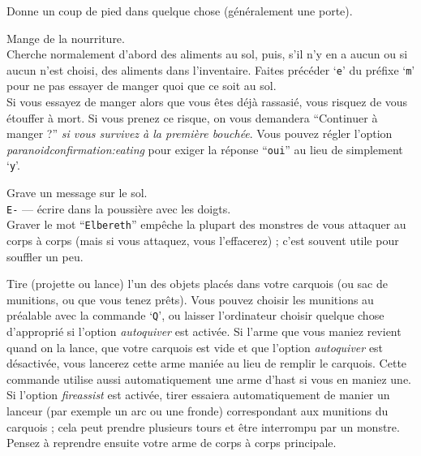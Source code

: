 \documentclass[titlepage]{article}
\begin{document}
\begin{description}[font=\mdseries\ttfamily]
\item[\textasciicircum D]
Donne un coup de pied dans quelque chose (généralement une porte).
\item[e]
Mange de la nourriture.\\
Cherche normalement d'abord des aliments au sol, puis, s'il n'y en a aucun
ou si aucun n'est choisi, des aliments dans l'inventaire.
Faites précéder `\texttt{e}' du préfixe `\texttt{m}' pour ne pas essayer de manger
quoi que ce soit au sol.\\
Si vous essayez de manger alors que vous êtes déjà rassasié, vous risquez de
vous étouffer à mort.
Si vous prenez ce risque, on vous demandera
``Continuer à manger ?'' \textit{si vous survivez à la première bouchée}.
Vous pouvez régler l'option
\textit{paranoid\textunderscore confirmation:eating}
pour exiger la réponse ``\texttt{oui}'' au lieu de simplement `\texttt{y}'.
\item[E]
Grave un message sur le sol.\\
\texttt{E-} --- écrire dans la poussière avec les doigts.\\
Graver le mot ``\texttt{Elbereth}'' empêche la plupart des monstres de vous attaquer
au corps à corps (mais si vous attaquez, vous l'effacerez) ; c'est
souvent utile pour souffler un peu.
\item[f]
Tire (projette ou lance) l'un des objets placés dans votre carquois (ou
sac de munitions, ou que vous tenez prêts).
Vous pouvez choisir les munitions au préalable avec la commande `\texttt{Q}', ou
laisser l'ordinateur choisir quelque chose d'approprié si l'option \textit{autoquiver} est activée.
Si l'arme que vous maniez revient quand on la lance, que votre carquois
est vide et que l'option \textit{autoquiver}
est désactivée, vous lancerez cette arme maniée au lieu de remplir le carquois.
Cette commande utilise aussi automatiquement une arme d'hast si vous en maniez une.
Si l'option \textit{fireassist} est activée, tirer essaiera automatiquement de manier un lanceur
(par exemple un arc ou une fronde) correspondant aux munitions du carquois ; cela peut
prendre plusieurs tours et être interrompu par un monstre.
Pensez à reprendre ensuite votre arme de corps à corps principale.
\\

\end{description}
\end{document}
